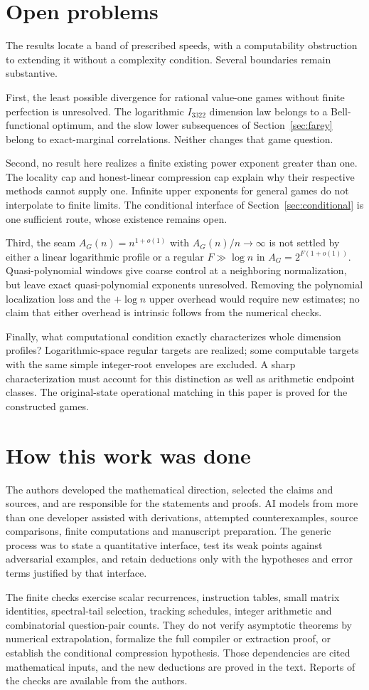 \section{Open problems}
The results locate a band of prescribed speeds, with a computability obstruction to extending it without a complexity condition. Several boundaries remain substantive.

First, the least possible divergence for rational value-one games without finite perfection is unresolved. The logarithmic $I_{3322}$ dimension law belongs to a Bell-functional optimum, and the slow lower subsequences of Section~\ref{sec:farey} belong to exact-marginal correlations. Neither changes that game question.

Second, no result here realizes a finite existing power exponent greater than one. The locality cap and honest-linear compression cap explain why their respective methods cannot supply one. Infinite upper exponents for general games do not interpolate to finite limits. The conditional interface of Section~\ref{sec:conditional} is one sufficient route, whose existence remains open.

Third, the seam $A_G(n)=n^{1+o(1)}$ with $A_G(n)/n\to\infty$ is not settled by either a linear logarithmic profile or a regular $F\gg\log n$ in $A_G=2^{F(1+o(1))}$. Quasi-polynomial windows give coarse control at a neighboring normalization, but leave exact quasi-polynomial exponents unresolved. Removing the polynomial localization loss and the $+\log n$ upper overhead would require new estimates; no claim that either overhead is intrinsic follows from the numerical checks.

Finally, what computational condition exactly characterizes whole dimension profiles? Logarithmic-space regular targets are realized; some computable targets with the same simple integer-root envelopes are excluded. A sharp characterization must account for this distinction as well as arithmetic endpoint classes. The original-state operational matching in this paper is proved for the constructed games.

\section{How this work was done}
The authors developed the mathematical direction, selected the claims and sources, and are responsible for the statements and proofs. AI models from more than one developer assisted with derivations, attempted counterexamples, source comparisons, finite computations and manuscript preparation. The generic process was to state a quantitative interface, test its weak points against adversarial examples, and retain deductions only with the hypotheses and error terms justified by that interface.

The finite checks exercise scalar recurrences, instruction tables, small matrix identities, spectral-tail selection, tracking schedules, integer arithmetic and combinatorial question-pair counts. They do not verify asymptotic theorems by numerical extrapolation, formalize the full compiler or extraction proof, or establish the conditional compression hypothesis. Those dependencies are cited mathematical inputs, and the new deductions are proved in the text. Reports of the checks are available from the authors.

